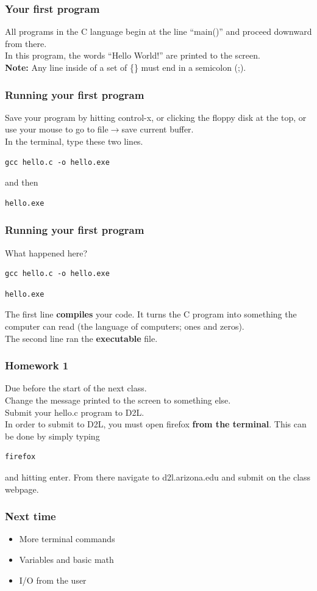 \documentclass{beamer}
\begin{document}
\begin{frame}[fragile]
  \frametitle{Your first program}
  
  All programs in the C language begin at the line ``main()'' and proceed
  downward from there.\\
  In this program, the words ``Hello World!'' are printed to the screen.\\
  \textbf{Note:} Any line inside of a set of \{\} must end in a semicolon (;).
\end{frame}

\begin{frame}[fragile]
  \frametitle{Running your first program}
  Save your program by hitting control-x, or clicking the floppy disk at the top,
  or use your mouse to go to file$\rightarrow$save current buffer.\\
  In the terminal, type these two lines.
  \begin{lstlisting}[style=custombash]
    gcc hello.c -o hello.exe
  \end{lstlisting}
  and then
  \begin{lstlisting}[style=custombash]
    hello.exe
  \end{lstlisting}
\end{frame}

\begin{frame}[fragile]
  \frametitle{Running your first program}
  What happened here?
  \begin{lstlisting}[style=custombash]
    gcc hello.c -o hello.exe
  \end{lstlisting}
  \begin{lstlisting}[style=custombash]
    hello.exe
  \end{lstlisting}
  The first line \textbf{compiles} your code. It turns the C program into something
  the computer can read (the language of computers; ones and zeros).\\
  The second line ran the \textbf{executable} file.
\end{frame}

\begin{frame}[fragile]
  \frametitle{Homework 1}
  Due before the start of the next class.\\
  Change the message printed to the screen to something else.\\
  Submit your hello.c program to D2L.\\
  In order to submit to D2L, you must open firefox \textbf{from the terminal}.
  This can be done by simply typing
  \begin{lstlisting}[style=custombash]
    firefox
  \end{lstlisting}
  and hitting enter. From there navigate to d2l.arizona.edu and submit on the
  class webpage.
\end{frame}

\begin{frame}
  \frametitle{Next time}
  \begin{itemize}
    \item More terminal commands
    \item Variables and basic math
    \item I/O from the user
  \end{itemize}
\end{frame}
\end{document}

